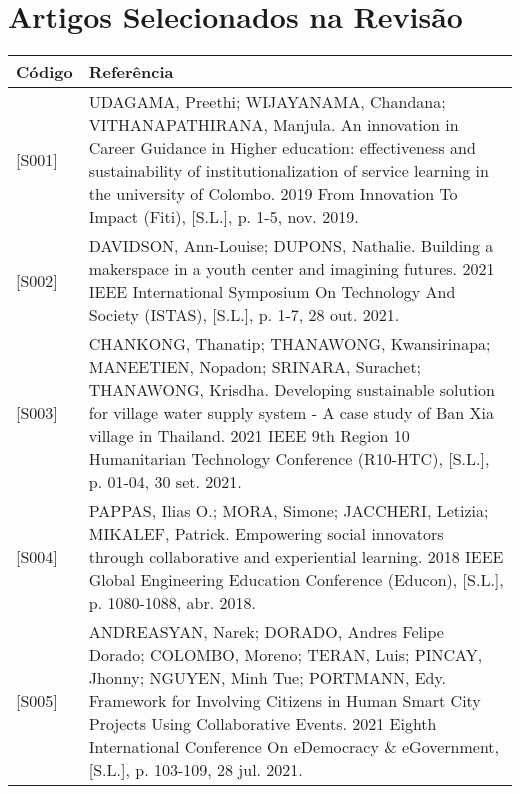 \chapter{Artigos Selecionados na Revisão}

\begin{table}[H]
\small
\centering
\renewcommand{\arraystretch}{1.2} %


\begin{tabularx}{\textwidth}{|l|Y|}
\hline
\textbf{Código} & \textbf{Referência} \\ \hline

{[}S001{]} & UDAGAMA, Preethi; WIJAYANAMA, Chandana; VITHANAPATHIRANA, Manjula. An innovation in Career Guidance in Higher edu\-cation: effectiveness and sustainability of institutionalization of service learning in the university of Colombo. 2019 From Innovation To Impact (Fiti), {[}S.L.{]}, p. 1-5, nov. 2019. \\ \hline

{[}S002{]} & DAVIDSON, Ann-Louise; DUPONS, Nathalie. Building a makerspace in a youth center and imagining futures. 2021 IEEE International Sympo\-sium On Technology And Society (ISTAS), {[}S.L.{]}, p. 1-7, 28 out. 2021. \\ \hline

{[}S003{]} & CHANKONG, Thanatip; THANAWONG, Kwansirinapa; MANEETIEN, Nopadon; SRINARA, Surachet; THANAWONG, Krisdha. Developing sustainable solution for village water supply system - A case study of Ban Xia village in Thailand. 2021 IEEE 9th Region 10 Humanitarian Technology Conference (R10-HTC), {[}S.L.{]}, p. 01-04, 30 set. 2021. \\ \hline

{[}S004{]} & PAPPAS, Ilias O.; MORA, Simone; JACCHERI, Letizia; MIKALEF, Patrick. Empowering social innovators through collaborative and experiential learning. 2018 IEEE Global Engineering Education Conference (Educon), {[}S.L.{]}, p. 1080-1088, abr. 2018. \\ \hline

{[}S005{]} & ANDREASYAN, Narek; DORADO, Andres Felipe Dorado; COLOMBO, Moreno; TERAN, Luis; PINCAY, Jhonny; NGUYEN, Minh Tue; PORTMANN, Edy. Framework for Involving Citizens in Human Smart City Projects Using Collaborative Events. 2021 Eighth International Conference On eDemocracy \& eGovernment, {[}S.L.{]}, p. 103-109, 28 jul. 2021. \\ \hline


\end{tabularx}
\end{table}
